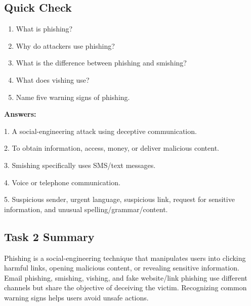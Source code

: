 \documentclass[12pt,a4paper]{article}
\begin{document}

\subsection{Quick Check}

\begin{enumerate}
    \item What is phishing?
    \item Why do attackers use phishing?
    \item What is the difference between phishing and smishing?
    \item What does vishing use?
    \item Name five warning signs of phishing.
\end{enumerate}

\textbf{Answers:}

1. A social-engineering attack using deceptive communication.

2. To obtain information, access, money, or deliver malicious content.

3. Smishing specifically uses SMS/text messages.

4. Voice or telephone communication.

5. Suspicious sender, urgent language, suspicious link, request for sensitive information, and unusual spelling/grammar/content.


\subsection{Task 2 Summary}

Phishing is a social-engineering technique that manipulates users into clicking harmful links, opening malicious content, or revealing sensitive information. Email phishing, smishing, vishing, and fake website/link phishing use different channels but share the objective of deceiving the victim. Recognizing common warning signs helps users avoid unsafe actions.



\end{document}
